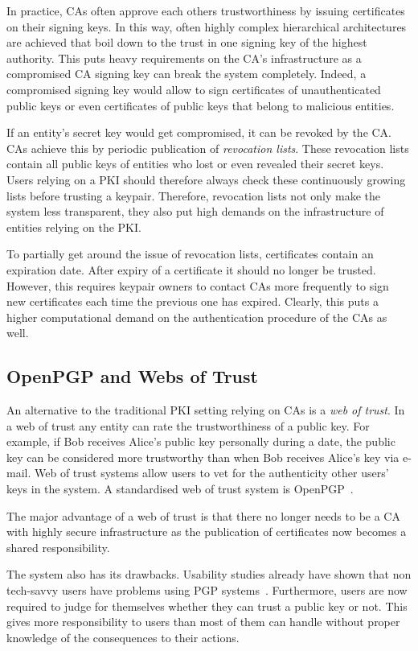 In practice, CAs often approve each others trustworthiness by issuing certificates on their signing keys. In this way, often highly complex hierarchical architectures are achieved that boil down to the trust in one signing key of the highest authority. This puts heavy requirements on the CA's infrastructure as a compromised CA signing key can break the system completely. Indeed, a compromised signing key would allow to sign certificates of unauthenticated public keys or even certificates of public keys that belong to malicious entities.

If an entity's secret key would get compromised, it can be revoked by the CA. CAs achieve this by periodic publication of \textit{revocation lists}. These revocation lists contain all public keys of entities who lost or even revealed their secret keys. Users relying on a PKI should therefore always check these continuously growing lists before trusting a keypair. Therefore, revocation lists not only make the system less transparent, they also put high demands on the infrastructure of entities relying on the PKI.

To partially get around the issue of revocation lists, certificates contain an expiration date. After expiry of a certificate it should no longer be trusted. However, this requires keypair owners to contact CAs more frequently to sign new certificates each time the previous one has expired. Clearly, this puts a higher computational demand on the authentication procedure of the CAs as well.

\subsection{OpenPGP and Webs of Trust}
An alternative to the traditional PKI setting relying on CAs is a \textit{web of trust}. In a web of trust any entity can rate the trustworthiness of a public key. For example, if Bob receives Alice's public key personally during a date, the public key can be considered more trustworthy than when Bob receives Alice's key via e-mail. Web of trust systems allow users to vet for the authenticity other users' keys in the system. A standardised web of trust system is OpenPGP~\cite{rfc4880}.

The major advantage of a web of trust is that there no longer needs to be a CA with highly secure infrastructure as the publication of certificates now becomes a shared responsibility.

The system also has its drawbacks. Usability studies already have shown that non tech-savvy users have problems using PGP systems~\cite{art:WhittenT99}. Furthermore, users are now required to judge for themselves whether they can trust a public key or not. This gives more responsibility to users than most of them can handle without proper knowledge of the consequences to their actions.

